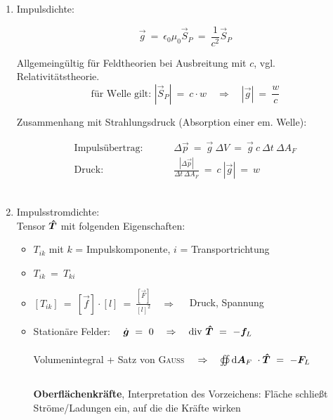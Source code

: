 \begin{enumerate}[label = \roman*)]
\item Impulsdichte:\

\begin{equation*}
\vec{g} \ = \ \epsilon_0\mu_0 \vec{S}_P \ = \ \frac{1}{c^2}\vec{S}_P
\end{equation*} 

Allgemeingültig für Feldtheorien bei Ausbreitung mit $c$, vgl. Relativitätstheorie.
\begin{equation*}
\text{für Welle gilt: } |\vec{S}_P| \ = \ c \cdot w \quad \Rightarrow \quad |\vec{g}| \ = \ \frac{w}{c} 
\end{equation*}

Zusammenhang mit Strahlungsdruck (Absorption einer em. Welle): 

\begin{align*}
\text{Impulsübertrag:  } \qquad & \Delta \vec{p} \ = \ \vec{g} \ \Delta V \ = \ \vec{g} \ c \ \Delta t \ \Delta A_F\\
\text{Druck: } \qquad & \frac{|\Delta\vec{p}|}{\Delta t \ \Delta A_F} \ = \ c \ |\vec{g}| \ = \ w
\end{align*}
\ \\

\item Impulsstromdichte: \\

Tensor $\bm{\hat{T}}$ mit folgenden Eigenschaften:

\begin{itemize}
\item $T_{ik}$ mit $k$ = Impulskomponente, $i$ = Transportrichtung
\item $T_{ik} \ = \ T_{ki}$
\item $ [T_{ik}] \ = \ [\vec{f}] \cdot [l] \ = \ \frac{[\vec{F}]}{[l]^2} \quad \Rightarrow \quad$ Druck, Spannung
\item Stationäre Felder: $\quad \dot{\vec{g}} \ = \ 0 \quad \Rightarrow \quad \div \tens{T} \ = \ -\vec{f}_L$\\
\ \\
Volumenintegral + Satz von \textsc{Gauss} $ \quad \Rightarrow \quad \oiint\limits_{{}}^{{}}\mathrm{d}{\bm{A}_F}\  \cdot \bm{\hat{T}} \ = \ - \bm{F}_L \quad$\\
\ \\
\textbf{Oberflächenkräfte}, Interpretation des Vorzeichens: Fläche schließt Ströme/Ladungen ein, auf die die Kräfte wirken
\end{itemize}
\end{enumerate}

